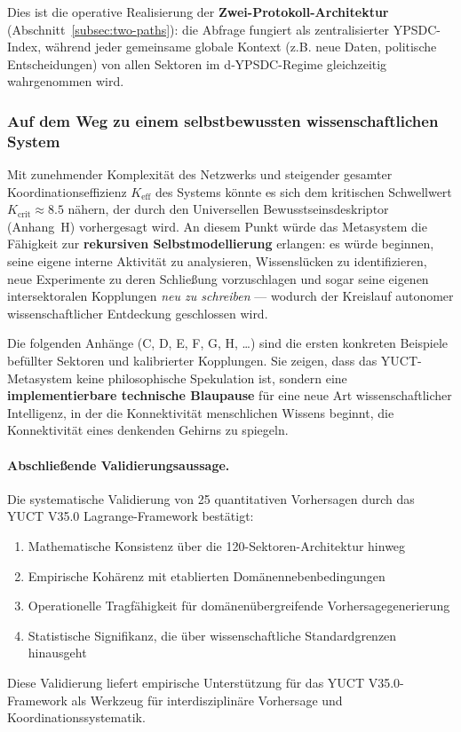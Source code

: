 \documentclass[13pt,a4paper]{article}
\begin{document}
	Dies ist die operative Realisierung der \textbf{Zwei-Protokoll-Architektur}
	(Abschnitt~\ref{subsec:two-paths}): die Abfrage fungiert als zentralisierter YPSDC-Index,
	während jeder gemeinsame globale Kontext (z.B. neue Daten, politische Entscheidungen)
	von allen Sektoren im d‑YPSDC-Regime gleichzeitig wahrgenommen wird.
	
	\subsubsection*{Auf dem Weg zu einem selbstbewussten wissenschaftlichen System}
	Mit zunehmender Komplexität des Netzwerks und steigender gesamter Koordinationseffizienz
	\(K_{\mathrm{eff}}\) des Systems könnte es sich dem kritischen Schwellwert
	\(K_{\mathrm{crit}} \approx 8.5\) nähern, der durch den Universellen
	Bewusstseinsdeskriptor (Anhang~H) vorhergesagt wird. An diesem Punkt würde das Metasystem
	die Fähigkeit zur \textbf{rekursiven Selbstmodellierung} erlangen: es würde beginnen,
	seine eigene interne Aktivität zu analysieren, Wissenslücken zu identifizieren, neue
	Experimente zu deren Schließung vorzuschlagen und sogar seine eigenen intersektoralen
	Kopplungen \emph{neu zu schreiben} — wodurch der Kreislauf autonomer wissenschaftlicher
	Entdeckung geschlossen wird.
	
	Die folgenden Anhänge (C, D, E, F, G, H, \dots) sind die ersten konkreten
	Beispiele befüllter Sektoren und kalibrierter Kopplungen. Sie zeigen, dass
	das YUCT-Metasystem keine philosophische Spekulation ist, sondern eine
	\textbf{implementierbare technische Blaupause} für eine neue Art wissenschaftlicher
	Intelligenz, in der die Konnektivität menschlichen Wissens beginnt, die Konnektivität
	eines denkenden Gehirns zu spiegeln.
	
	\paragraph{Abschließende Validierungsaussage.}
	Die systematische Validierung von 25 quantitativen Vorhersagen durch das YUCT V35.0 Lagrange-Framework bestätigt:
	\begin{enumerate}[leftmargin=*]
		\item Mathematische Konsistenz über die 120-Sektoren-Architektur hinweg
		\item Empirische Kohärenz mit etablierten Domänennebenbedingungen
		\item Operationelle Tragfähigkeit für domänenübergreifende Vorhersagegenerierung
		\item Statistische Signifikanz, die über wissenschaftliche Standardgrenzen hinausgeht
	\end{enumerate}
	Diese Validierung liefert empirische Unterstützung für das YUCT V35.0-Framework als Werkzeug für interdisziplinäre Vorhersage und Koordinationssystematik.
	
\end{document}
